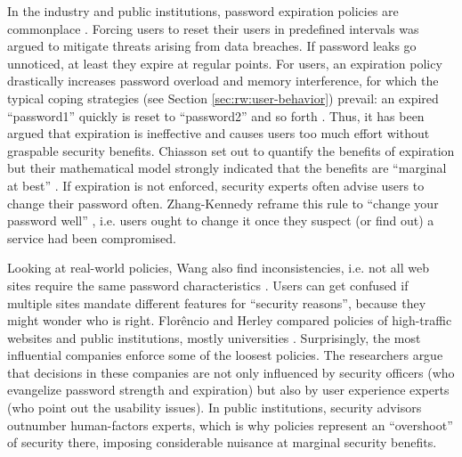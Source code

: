 	

	

	In the industry and public institutions, password expiration policies are commonplace  \cite{Inglesant2010TrueCostOfUnusablePolicies,Chiasson2015QuantifyingExpiration}. Forcing users to reset their users in predefined intervals was argued to mitigate threats arising from data breaches. If password leaks go unnoticed, at least they expire at regular points. For users, an expiration policy drastically increases password overload and memory interference, for which the typical coping strategies (see Section \ref{sec:rw:user-behavior}) prevail: an expired ``password1'' quickly is reset to ``password2'' and so forth \cite{Zhang2010PasswordExpiration}. Thus, it has been argued that expiration is ineffective and causes users too much effort without graspable security benefits. Chiasson \etal set out to quantify the benefits of expiration but their mathematical model strongly indicated that the benefits are ``marginal at best'' \cite{Chiasson2015QuantifyingExpiration}. If expiration is not enforced, security experts often advise users to change their password often. Zhang-Kennedy \etal reframe this rule to ``change your password well'' \cite{ZhangKennedy2016RevisitingPasswordRules}, i.e. users ought to change it once they suspect (or find out) a service had been compromised.
	
	
	Looking at real-world policies, Wang \etal also find inconsistencies, i.e. not all web sites require the same password characteristics	\cite{Wang2015EmperorsPolicies}. Users can get confused if multiple sites mandate different features for ``security reasons'', because they might wonder who is right. Florêncio and Herley compared policies of high-traffic websites and public institutions, mostly universities \cite{Florencio2010WhereDoPoliciesComeFrom}. Surprisingly, the most influential companies enforce some of the loosest policies. The researchers argue that decisions in these companies are not only influenced by security officers (who evangelize password strength and expiration) but also by user experience experts (who point out the usability issues). In public institutions, security advisors outnumber human-factors experts, which is why policies represent an ``overshoot'' of security there, imposing considerable nuisance at marginal security benefits. 
	
